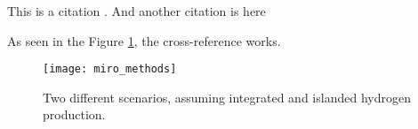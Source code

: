 \lipsum[1]
This is a citation \cite{Schumm2018}. And another citation is here \cite{Neumann2021}

As seen in the Figure \ref{fig:methods_scenarios}, the cross-reference works.

\begin{figure}[h!]
    \centering
    \texttt{[image: miro\_methods]}
    \caption{Two different scenarios, assuming integrated and islanded hydrogen production.}
    \label{fig:methods_scenarios}
\end{figure}

